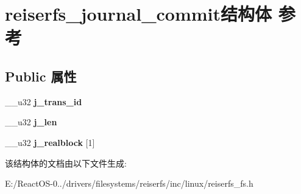 \hypertarget{structreiserfs__journal__commit}{}\section{reiserfs\+\_\+journal\+\_\+commit结构体 参考}
\label{structreiserfs__journal__commit}
\subsection*{Public 属性}
\begin{DoxyCompactItemize}
\item 
\mbox{\label{structreiserfs__journal__commit_ac7592d386a4694ca3d072640c21a11dd}} 
\+\_\+\+\_\+u32 {\bfseries j\+\_\+trans\+\_\+id}
\item 
\mbox{\label{structreiserfs__journal__commit_afd47a18a5c7fde6790054e18acc580fb}} 
\+\_\+\+\_\+u32 {\bfseries j\+\_\+len}
\item 
\mbox{\label{structreiserfs__journal__commit_abefcdec0857026d11d7b66f7c121dce1}} 
\+\_\+\+\_\+u32 {\bfseries j\+\_\+realblock} \mbox{[}1\mbox{]}
\end{DoxyCompactItemize}


该结构体的文档由以下文件生成\+:\begin{DoxyCompactItemize}
\item 
E\+:/\+React\+O\+S-\/0../drivers/filesystems/reiserfs/inc/linux/reiserfs\+\_\+fs.\+h\end{DoxyCompactItemize}
